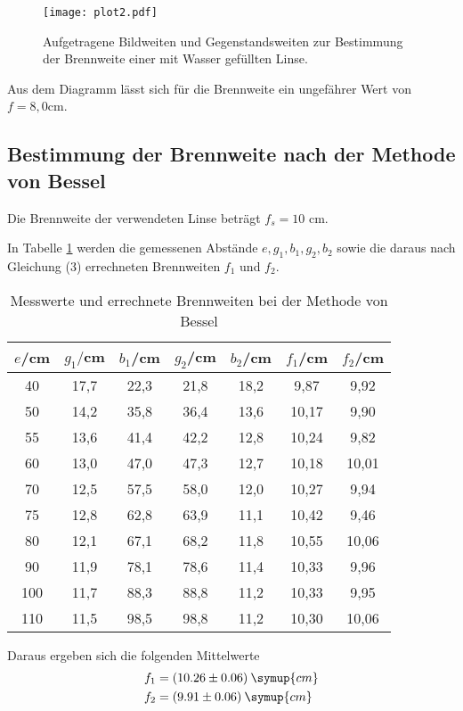 \begin{figure}[H]
  \centering
  \texttt{[image: plot2.pdf]}
  \caption{Aufgetragene Bildweiten und Gegenstandsweiten zur Bestimmung der Brennweite einer mit Wasser gefüllten Linse.}
  \label{fig:plot}
\end{figure}


Aus dem Diagramm lässt sich für die Brennweite ein ungefährer Wert von  $f = 8,0$cm.


\subsection{Bestimmung der Brennweite nach der Methode von Bessel}
Die Brennweite der verwendeten Linse beträgt $f_s= 10$ cm.

In Tabelle \ref{tab:bessel} werden die gemessenen Abstände $e, g_1, b_1, g_2, b_2$ sowie die daraus nach Gleichung (3)
errechneten Brennweiten $f_1$ und $f_2$.
\begin{table}[H]
  \centering
  \caption{Messwerte und errechnete Brennweiten bei der Methode von Bessel}
  \label{tab:bessel}
  \begin{tabular}{c c c c c c c}
    \toprule
    $e$/cm  & $g_1/$cm & $b_1$/cm & $g_2$/cm & $b_2$/cm & $f_1$/cm & $f_2$/cm \\
    \midrule
    40  &   17,7  & 22,3  &  21,8 &   18,2 & 9,87  & 9,92 \\
    50   &  14,2  & 35,8   & 36,4  &  13,6 & 10,17 & 9,90 \\
    55   &  13,6  & 41,4   & 42,2  &  12,8 & 10,24 & 9,82 \\
    60  &   13,0  & 47,0   & 47,3  &  12,7 & 10,18 & 10,01 \\
    70  &   12,5 &  57,5  &  58,0  &  12,0 & 10,27 & 9,94 \\
    75  &   12,8 &  62,8  &  63,9  &  11,1 & 10,42 & 9,46 \\
    80  &   12,1 &  67,1  &  68,2  &  11,8 & 10,55 & 10,06 \\
    90  &   11,9 &  78,1  &  78,6  &  11,4 & 10,33 & 9,96 \\
    100  &  11,7 &  88,3  &  88,8  &  11,2 & 10,33 & 9,95 \\
    110  &  11,5 &  98,5  &  98,8  &  11,2 & 10,30 & 10,06  \\
    \bottomrule
  \end{tabular}
\end{table}

Daraus ergeben sich die folgenden Mittelwerte
\begin{align*}
  &f_1 = (10.26 \pm 0.06) \: \symup{cm} \\
  &f_2 = (9.91 \pm 0.06) \: \symup{cm}
\end{align*}

